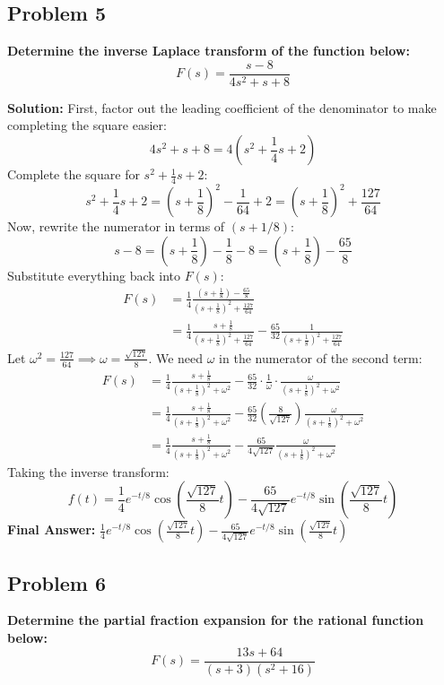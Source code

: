 \documentclass[11pt, a4paper]{article}
\theoremstyle{definition}
\theoremstyle{remark}
\begin{document}
\subsection*{Problem 5}
\textbf{Determine the inverse Laplace transform of the function below:}
\[ F(s) = \frac{s - 8}{4s^2 + s + 8} \]

\textbf{Solution:}
First, factor out the leading coefficient of the denominator to make completing the square easier:
\[ 4s^2 + s + 8 = 4\left(s^2 + \frac{1}{4}s + 2\right) \]
Complete the square for $s^2 + \frac{1}{4}s + 2$:
\[ s^2 + \frac{1}{4}s + 2 = \left(s + \frac{1}{8}\right)^2 - \frac{1}{64} + 2 = \left(s + \frac{1}{8}\right)^2 + \frac{127}{64} \]
Now, rewrite the numerator in terms of $(s + 1/8)$:
\[ s - 8 = \left(s + \frac{1}{8}\right) - \frac{1}{8} - 8 = \left(s + \frac{1}{8}\right) - \frac{65}{8} \]
Substitute everything back into $F(s)$:
\begin{align*}
    F(s) &= \frac{1}{4} \frac{\left(s + \frac{1}{8}\right) - \frac{65}{8}}{\left(s + \frac{1}{8}\right)^2 + \frac{127}{64}} \\
    &= \frac{1}{4} \frac{s + \frac{1}{8}}{\left(s + \frac{1}{8}\right)^2 + \frac{127}{64}} - \frac{65}{32} \frac{1}{\left(s + \frac{1}{8}\right)^2 + \frac{127}{64}}
\end{align*}
Let $\omega^2 = \frac{127}{64} \implies \omega = \frac{\sqrt{127}}{8}$. We need $\omega$ in the numerator of the second term:
\begin{align*}
    F(s) &= \frac{1}{4} \frac{s + \frac{1}{8}}{\left(s + \frac{1}{8}\right)^2 + \omega^2} - \frac{65}{32} \cdot \frac{1}{\omega} \cdot \frac{\omega}{\left(s + \frac{1}{8}\right)^2 + \omega^2} \\
    &= \frac{1}{4} \frac{s + \frac{1}{8}}{\left(s + \frac{1}{8}\right)^2 + \omega^2} - \frac{65}{32} \left(\frac{8}{\sqrt{127}}\right) \frac{\omega}{\left(s + \frac{1}{8}\right)^2 + \omega^2} \\
    &= \frac{1}{4} \frac{s + \frac{1}{8}}{\left(s + \frac{1}{8}\right)^2 + \omega^2} - \frac{65}{4\sqrt{127}} \frac{\omega}{\left(s + \frac{1}{8}\right)^2 + \omega^2}
\end{align*}
Taking the inverse transform:
\[ f(t) = \frac{1}{4} e^{-t/8} \cos\left(\frac{\sqrt{127}}{8}t\right) - \frac{65}{4\sqrt{127}} e^{-t/8} \sin\left(\frac{\sqrt{127}}{8}t\right) \]
\textbf{Final Answer:} $\frac{1}{4} e^{-t/8} \cos\left(\frac{\sqrt{127}}{8}t\right) - \frac{65}{4\sqrt{127}} e^{-t/8} \sin\left(\frac{\sqrt{127}}{8}t\right)$

\subsection*{Problem 6}
\textbf{Determine the partial fraction expansion for the rational function below:}
\[ F(s) = \frac{13s + 64}{(s+3)(s^2+16)} \]
\end{document}
